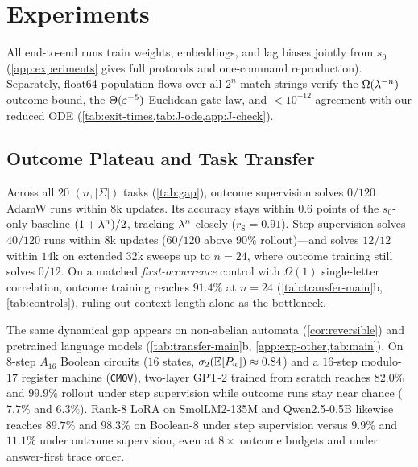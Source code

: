 \section{Experiments}
\label{sec:experiments}
\label{sec:validation}

All end-to-end runs train weights, embeddings, and lag biases jointly from $s_0$ (\cref{app:experiments} gives full protocols and one-command reproduction). Separately, float64 population flows over all $2^n$ match strings verify the $\Omega(\lambda^{-n})$ outcome bound, the $\Theta(\varepsilon^{-5})$ Euclidean gate law, and $< 10^{-12}$ agreement with our reduced ODE (\cref{tab:exit-times,tab:J-ode,app:J-check}).

\subsection{Outcome Plateau and Task Transfer}

Across all $20$ $(n, |\Sigma|)$ tasks (\cref{tab:gap}), outcome supervision solves $0/120$ AdamW runs within $8$k updates. Its accuracy stays within $0.6$ points of the $s_0$-only baseline $(1 + \lambda^n)/2$, tracking $\lambda^n$ closely ($r_{\mathrm S} = 0.91$). Step supervision solves $40/120$ runs within $8$k updates ($60/120$ above $90\%$ rollout)—and solves $12/12$ within $14$k on extended $32$k sweeps up to $n = 24$, where outcome training still solves $0/12$. On a matched \emph{first-occurrence} control with $\Omega(1)$ single-letter correlation, outcome training reaches $91.4\%$ at $n = 24$ (\cref{tab:transfer-main}b, \cref{tab:controls}), ruling out context length alone as the bottleneck.

The same dynamical gap appears on non-abelian automata (\cref{cor:reversible}) and pretrained language models (\cref{tab:transfer-main}b, \cref{app:exp-other,tab:main}). On $8$-step $A_{16}$ Boolean circuits ($16$ states, $\sigma_2(\mathbb E[P_w]) \approx 0.84$) and a $16$-step modulo-$17$ register machine (\texttt{CMOV}), two-layer GPT-2 trained from scratch reaches $82.0\%$ and $99.9\%$ rollout under step supervision while outcome runs stay near chance ($7.7\%$ and $6.3\%$). Rank-$8$ LoRA on SmolLM2-135M and Qwen2.5-0.5B \citep{allal2025smollm2,qwen2025qwen25} likewise reaches $89.7\%$ and $98.3\%$ on Boolean-$8$ under step supervision versus $9.9\%$ and $11.1\%$ under outcome supervision, even at $8\times$ outcome budgets and under answer-first trace order.

